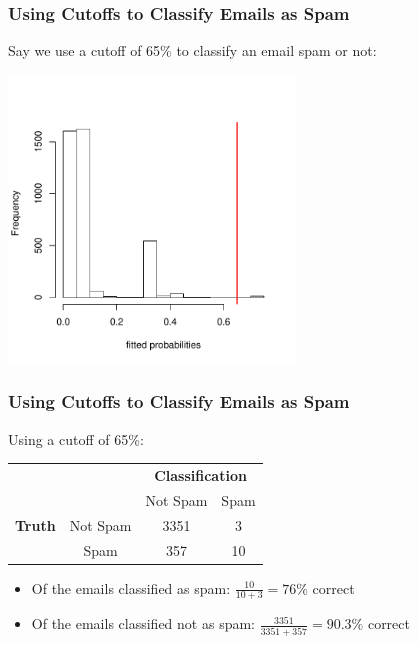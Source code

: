 \documentclass[handout]{beamer}
\newcommand{\blue}[1]{\textcolor{blue2}{#1}}
\begin{document}
\begin{frame}[fragile]
\frametitle{Using Cutoffs to Classify Emails as Spam}

Say we use a cutoff of 65\% to \blue{classify} an email spam or not:
\begin{center}
\includegraphics[width=3in]{figure/fitted2.pdf}
\end{center}

\end{frame}


\begin{frame}[fragile]
\frametitle{Using Cutoffs to Classify Emails as Spam}

Using a cutoff of 65\%:
\begin{center}
  \begin{tabular}{cc|cc}
     \multicolumn{2}{c}{}  & \multicolumn{2}{c}{\textbf{Classification}} \\ 
     &  & Not Spam & Spam \\ 
\hline
    \textbf{Truth} & Not Spam & 3351 & 3\\
     & Spam & 357 & 10\\ 
    \hline
  \end{tabular}
\end{center}
\pause
\begin{itemize}
\item Of the emails classified as spam:  $\frac{10}{10+3} = 76\%$ correct
\item Of the emails classified not as spam:  $\frac{3351}{3351+357} = 90.3\%$ correct
\end{itemize}


\end{frame}
\end{document}
